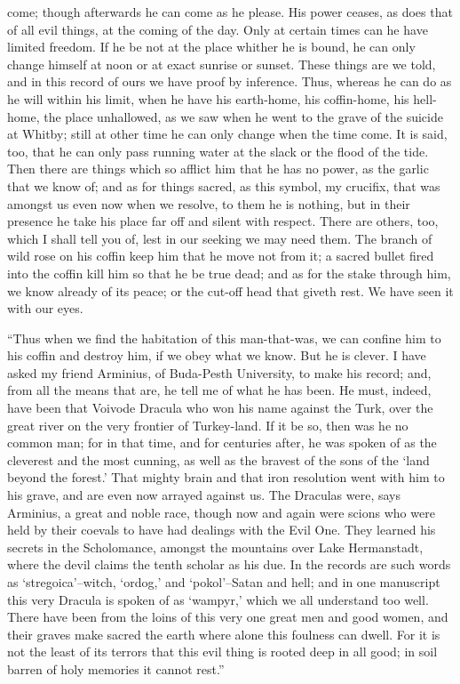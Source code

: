 \documentclass[12pt,openright]{book}
\begin{document}
come; though afterwards he can come as he please. His power ceases, as does that of all evil things, at the coming of the day. Only at certain times can he have limited freedom. If he be not at the place whither he is bound, he can only change himself at noon or at exact sunrise or sunset. These things are we told, and in this record of ours we have proof by inference. Thus, whereas he can do as he will within his limit, when he have his earth-home, his coffin-home, his hell-home, the place unhallowed, as we saw when he went to the grave of the suicide at Whitby; still at other time he can only change when the time come. It is said, too, that he can only pass running water at the slack or the flood of the tide. Then there are things which so afflict him that he has no power, as the garlic that we know of; and as for things sacred, as this symbol, my crucifix, that was amongst us even now when we resolve, to them he is nothing, but in their presence he take his place far off and silent with respect. There are others, too, which I shall tell you of, lest in our seeking we may need them. The branch of wild rose on his coffin keep him that he move not from it; a sacred bullet fired into the coffin kill him so that he be true dead; and as for the stake through him, we know already of its peace; or the cut-off head that giveth rest. We have seen it with our eyes.

“Thus when we find the habitation of this man-that-was, we can confine him to his coffin and destroy him, if we obey what we know. But he is clever. I have asked my friend Arminius, of Buda-Pesth University, to make his record; and, from all the means that are, he tell me of what he has been. He must, indeed, have been that Voivode Dracula who won his name against the Turk, over the great river on the very frontier of Turkey-land. If it be so, then was he no common man; for in that time, and for centuries after, he was spoken of as the cleverest and the most cunning, as well as the bravest of the sons of the ‘land beyond the forest.’ That mighty brain and that iron resolution went with him to his grave, and are even now arrayed against us. The Draculas were, says Arminius, a great and noble race, though now and again were scions who were held by their coevals to have had dealings with the Evil One. They learned his secrets in the Scholomance, amongst the mountains over Lake Hermanstadt, where the devil claims the tenth scholar as his due. In the records are such words as ‘stregoica’–witch, ‘ordog,’ and ‘pokol’–Satan and hell; and in one manuscript this very Dracula is spoken of as ‘wampyr,’ which we all understand too well. There have been from the loins of this very one great men and good women, and their graves make sacred the earth where alone this foulness can dwell. For it is not the least of its terrors that this evil thing is rooted deep in all good; in soil barren of holy memories it cannot rest.”
\end{document}
